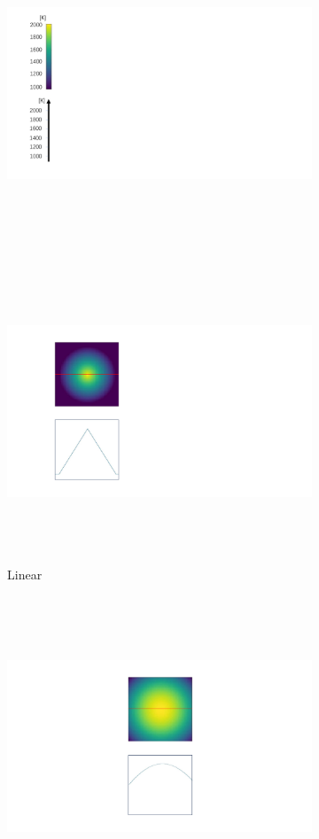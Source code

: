 \begin{figure}[htbp]
    \centering
    \begin{subfigure}{0.08\textwidth}
        \centering
        \includegraphics[height=9cm]{figures/temp_distribution_colorbar.pdf}
        \caption*{}        
    \end{subfigure}
    \begin{subfigure}{0.3\textwidth}
        \centering
        \includegraphics[height=9cm]{figures/temp_distribution_a_1.pdf}
        \caption{Linear}
        \label{fig: linear_distribution}        
    \end{subfigure}
    \begin{subfigure}{0.3\textwidth}
        \centering
        \includegraphics[height=9cm]{figures/temp_distribution_b_1.pdf}

\end{subfigure}
\end{figure}
